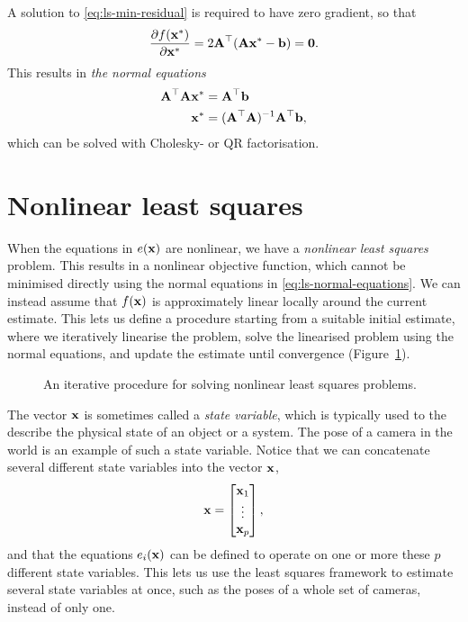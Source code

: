 A solution to \eqref{eq:ls-min-residual} is required to have zero gradient, so that
\begin{equation}
  \frac{\partial f({\boldsymbol{\mathbf{x}}}^\ast)}{\partial{\boldsymbol{\mathbf{x}}}^\ast} = 2 {\boldsymbol{\mathbf{A}}}^{\top} ({\boldsymbol{\mathbf{A}}} {\boldsymbol{\mathbf{x}}}^\ast - {\boldsymbol{\mathbf{b}}}) = \boldsymbol{\mathbf{0}}.
\end{equation}
This results in \emph{the normal equations}
\begin{align}
  {\boldsymbol{\mathbf{A}}}^{\top} {\boldsymbol{\mathbf{A}}} {\boldsymbol{\mathbf{x}}}^\ast &= {\boldsymbol{\mathbf{A}}}^{\top} {\boldsymbol{\mathbf{b}}} \label{eq:ls-normal-equations}\\
  {\boldsymbol{\mathbf{x}}}^\ast &= ({\boldsymbol{\mathbf{A}}}^{\top} {\boldsymbol{\mathbf{A}}})^{-1} {\boldsymbol{\mathbf{A}}}^{\top} {\boldsymbol{\mathbf{b}}},
\end{align}
which can be solved with Cholesky- or QR factorisation\footnotemark.

\section{Nonlinear least squares}
When the equations in $e({\boldsymbol{\mathbf{x}}})$ are nonlinear, we have a \emph{nonlinear least squares} problem.
This results in a nonlinear objective function, which cannot be minimised directly using the normal equations in \eqref{eq:ls-normal-equations}.
We can instead assume that $f({\boldsymbol{\mathbf{x}}})$ is approximately linear locally around the current estimate.
This lets us define a procedure starting from a suitable initial estimate, where we iteratively linearise the problem, solve the linearised problem using the normal equations, and update the estimate until convergence (Figure~\ref{fig:nls-procedure}).
\begin{figure}[htb]
    \centering
    
    \caption{An iterative procedure for solving nonlinear least squares problems.}
    \label{fig:nls-procedure}
\end{figure}

The vector ${\boldsymbol{\mathbf{x}}}$ is sometimes called a \emph{state variable}, which is typically used to the describe the physical state of an object or a system.
The pose of a camera in the world is an example of such a state variable.
Notice that we can concatenate several different state variables into the vector ${\boldsymbol{\mathbf{x}}}$, 
\begin{equation}
  {\boldsymbol{\mathbf{x}}} = 
  \begin{bmatrix}
    {\boldsymbol{\mathbf{x}}}_1\\
    \vdots\\
    {\boldsymbol{\mathbf{x}}}_p
  \end{bmatrix},
\end{equation}
and that the equations $e_i({\boldsymbol{\mathbf{x}}})$ can be defined to operate on one or more these $p$ different state variables.
This lets us use the least squares framework to estimate several state variables at once, such as the poses of a whole set of cameras, instead of only one.

